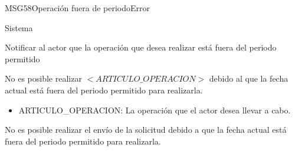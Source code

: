 \begin{mensaje}{MSG58}{Operación fuera de periodo}{Error}
	\item[Canal:] Sistema
	\item[Propósito:] Notificar al actor que la operación que desea realizar está fuera del periodo permitido
	\item[Redacción:] No es posible realizar $<ARTICULO\_OPERACION>$ debido al que la fecha actual está fuera del periodo permitido para realizarla.
	\item[Parámetros:] 
	\begin{itemize}
		\item ARTICULO\_OPERACION: La operación que el actor desea llevar a cabo.
	\end{itemize}
	\item[Ejemplo:] No es posible realizar el envío de la solicitud debido a que la fecha actual está fuera del periodo permitido para realizarla.
\end{mensaje}


